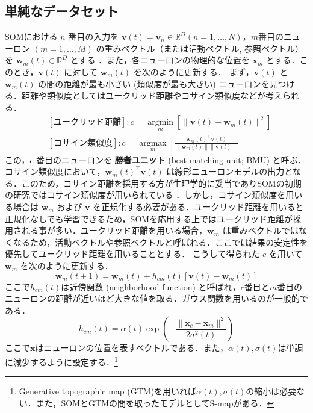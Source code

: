 \subsection{単純なデータセット}
SOMにおける $n$ 番目の入力を $\mathbf{v}(t)=\mathbf{v}_n\in \mathbb{R}^{D} (n=1, \ldots, N)$，$m$番目のニューロン $(m=1, \ldots, M)$ の重みベクトル（または活動ベクトル, 参照ベクトル）を $\mathbf{w}_m(t)\in \mathbb{R}^{D}$ とする \citep{Kohonen2013-yt}．また，各ニューロンの物理的な位置を $\mathbf{x}_m$ とする．このとき，$\mathbf{v}(t)$ に対して $\mathbf{w}_m(t)$ を次のように更新する．
まず，$\mathbf{v}(t)$ と $\mathbf{w}_m(t)$ の間の距離が最も小さい (類似度が最も大きい) ニューロンを見つける．距離や類似度としてはユークリッド距離やコサイン類似度などが考えられる．
\begin{align}
&[\text{ユークリッド距離}]: c = \underset{m}{\operatorname{argmin}}\left[\|\mathbf{v}(t)-\mathbf{w}_m(t)\|^2\right]\\
&[\text{コサイン類似度}]: c  = \underset{m}{\operatorname{argmax}}\left[\frac{\mathbf{w}_m(t)^\top\mathbf{v}(t)}{\|\mathbf{w}_m(t)\|\|\mathbf{v}(t)\|}\right]
\end{align}
この，$c$ 番目のニューロンを \textbf{勝者ユニット} (best matching unit; BMU) と呼ぶ．コサイン類似度において，$\mathbf{w}_m(t)^\top\mathbf{v}(t)$ は線形ニューロンモデルの出力となる．このため，コサイン距離を採用する方が生理学的に妥当でありSOMの初期の研究ではコサイン類似度が用いられている \citep{Kohonen1982-mn}．しかし，コサイン類似度を用いる場合は $\mathbf{w}_m$ および $\mathbf{v}$ を正規化する必要がある．ユークリッド距離を用いると正規化なしでも学習できるため，SOMを応用する上ではユークリッド距離が採用される事が多い．ユークリッド距離を用いる場合，$\mathbf{w}_m$ は重みベクトルではなくなるため，活動ベクトルや参照ベクトルと呼ばれる．ここでは結果の安定性を優先してユークリッド距離を用いることとする．
こうして得られた $c$ を用いて $\mathbf{w}_m$ を次のように更新する．
\begin{equation}
\mathbf{w}_m(t+1)=\mathbf{w}_m(t)+h_{cm}(t)[\mathbf{v}(t)-\mathbf{w}_m(t)]
\end{equation}
ここで$h_{cm}(t)$は近傍関数 (neighborhood function) と呼ばれ，$c$番目と$m$番目のニューロンの距離が近いほど大きな値を取る．ガウス関数を用いるのが一般的である．
\begin{equation}
h_{cm}(t)=\alpha(t)\exp\left(-\frac{\|\mathbf{x}_c-\mathbf{x}_m\|^2}{2\sigma^2(t)}\right)
\end{equation}
ここで$\mathbf{x}$はニューロンの位置を表すベクトルである．また，$\alpha(t), \sigma(t)$は単調に減少するように設定する．\footnote{Generative topographic map (GTM)を用いれば$\alpha(t), \sigma(t)$の縮小は必要ない．また，SOMとGTMの間を取ったモデルとしてS-mapがある．}

